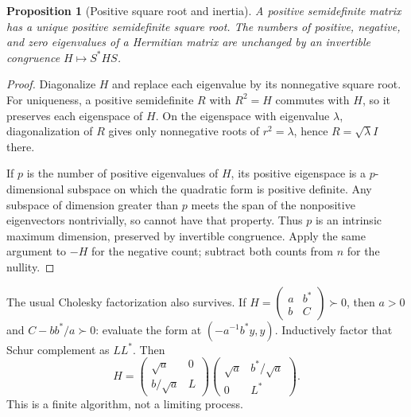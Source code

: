 \documentclass[11pt,a4paper]{article}
\numberwithin{equation}{section}
\newtheorem{proposition}[proposition]{Proposition}
\theoremstyle{definition}
\theoremstyle{remark}
\begin{document}
\begin{proposition}[Positive square root and inertia]\label{prop:positive}
A positive semidefinite matrix has a unique positive semidefinite square
root. The numbers of positive, negative, and zero eigenvalues of a
Hermitian matrix are unchanged by an invertible congruence $H\mapsto S^*HS$.
\end{proposition}
\begin{proof}
Diagonalize $H$ and replace each eigenvalue by its nonnegative square root.
For uniqueness, a positive semidefinite $R$ with $R^2=H$ commutes with $H$,
so it preserves each eigenspace of $H$. On the eigenspace with eigenvalue
$\lambda$, diagonalization of $R$ gives only nonnegative roots of
$r^2=\lambda$, hence $R=\sqrt\lambda I$ there.

If $p$ is the number of positive eigenvalues of $H$, its positive eigenspace
is a $p$-dimensional subspace on which the quadratic form is positive
 definite. Any subspace of dimension greater than $p$ meets the span of the
nonpositive eigenvectors nontrivially, so cannot have that property. Thus
$p$ is an intrinsic maximum dimension, preserved by invertible congruence.
Apply the same argument to $-H$ for the negative count; subtract both counts
from $n$ for the nullity.
\end{proof}

The usual Cholesky factorization also survives. If
$H=\left(\begin{smallmatrix}a&b^*\\b&C\end{smallmatrix}\right)\succ0$,
then $a>0$ and $C-bb^*/a\succ0$: evaluate the form at
$(-a^{-1}b^*y,y)$. Inductively factor that Schur complement as $LL^*$.
Then
\[
 H=\begin{pmatrix}\sqrt a&0\\b/\sqrt a&L\end{pmatrix}
   \begin{pmatrix}\sqrt a&b^*/\sqrt a\\0&L^*\end{pmatrix}.
\]
This is a finite algorithm, not a limiting process.
\end{document}
